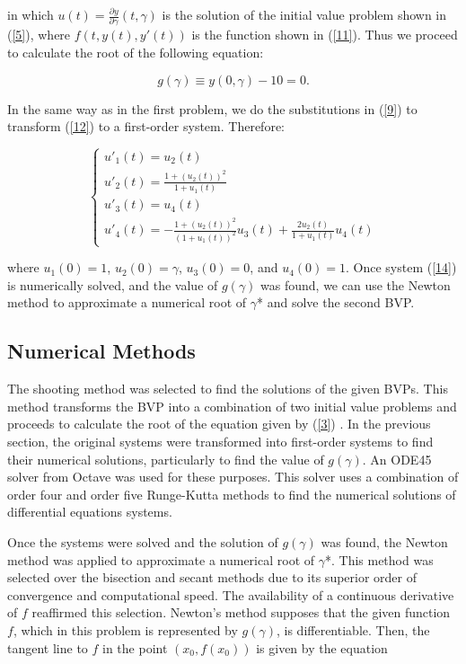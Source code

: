 \documentclass{article}
\begin{document}
in which $u(t)=\frac{\partial y}{\partial \gamma}(t, \gamma)$ is the solution of the initial value problem shown in (\ref{5}), where $f(t,y(t),y'(t))$ is the function shown in (\ref{11}). Thus we proceed to calculate the root of the following equation:

\begin{equation}\label{13}
g(\gamma)\equiv y(0,\gamma)-10=0.
\end{equation}

In the same way as in the first problem, we do the substitutions in (\ref{9}) to transform (\ref{12}) to a first-order system. Therefore: 

\begin{equation}\label{14}
    \begin{cases}
        u'_1(t)=u_2(t)\\
        u'_2(t)=\frac{1+(u_2(t))^2}{1+u_1(t)}\\
        u'_3(t)=u_4(t)\\
        u'_4(t)=-\frac{1+(u_2(t))^2}{(1+u_1(t))^2}u_3(t)+\frac{2u_2(t)}{1+u_1(t)}u_4(t)
    \end{cases}
\end{equation}

where $u_1(0)=1$, $u_2(0)=\gamma$, $u_3(0)=0$, and $u_4(0)=1$. Once system (\ref{14}) is numerically solved, and the value of $g(\gamma)$ was found, we can use the Newton method to approximate a numerical root of $\gamma$* and solve the second BVP.

\subsection{Numerical Methods}

The shooting method was selected to find the solutions of the given BVPs. This method transforms the BVP into a combination of two initial value problems and proceeds to calculate the root of the equation given by (\ref{3}) \cite{Adam}. In the previous section, the original systems were transformed into first-order systems to find their numerical solutions, particularly to find the value of $g(\gamma)$. An ODE45 solver from Octave was used for these purposes. This solver uses a combination of order four and order five Runge-Kutta methods to find the numerical solutions of differential equations systems. 

Once the systems were solved and the solution of $g(\gamma)$ was found, the Newton method was applied to approximate a numerical root of $\gamma$*. This method was selected over the bisection and secant methods due to its superior order of convergence and computational speed. The availability of a continuous derivative of $f$ reaffirmed this selection. Newton's method supposes that the given function $f$, which in this problem is represented by $g(\gamma)$, is differentiable. Then, the tangent line to $f$ in the point $(x_0, f(x_0))$ is given by the equation
\end{document}
